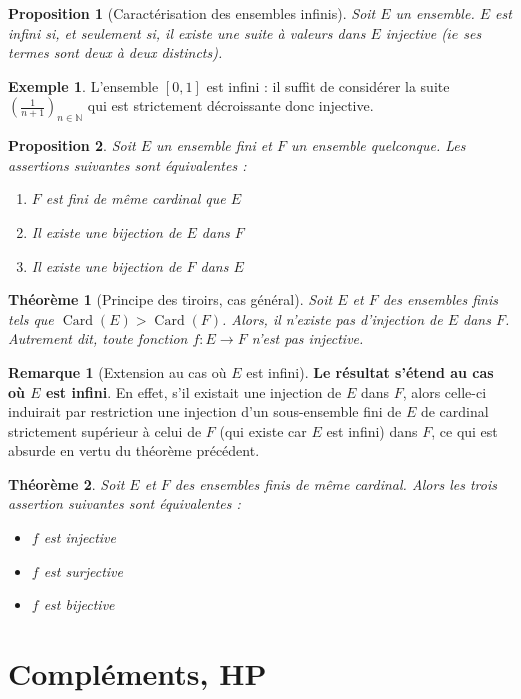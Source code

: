 \documentclass[french]{book}
\newcommand{\N}{\mathbb{N}}
\theoremstyle{plain}
\newtheorem{thm}{Théorème}[chapter]
\newtheorem{prop}{Proposition}[chapter]
\theoremstyle{definition}
\newtheorem{exa}{Exemple}[chapter]
\newtheorem{rmq}{Remarque}[chapter]
\theoremstyle{remark}
\DeclareMathOperator{\card}{Card}
\begin{document}
\begin{prop}[Caractérisation des ensembles infinis]
	Soit $E$ un ensemble. $E$ est infini si, et seulement si, il existe une suite à valeurs dans $E$ injective ($ie$ ses termes sont deux à deux distincts).
\end{prop}
\begin{exa}
	L'ensemble $[0,1]$ est infini : il suffit de considérer la suite $\displaystyle\left(\frac{1}{n+1}\right)_{n\in\N}$ qui est strictement décroissante donc injective.
\end{exa}
\begin{prop}
	Soit $E$ un ensemble fini et $F$ un ensemble quelconque. Les assertions suivantes sont équivalentes :
	\begin{enumerate}
		\item $F$ est fini de même cardinal que $E$
		\item Il existe une bijection de $E$ dans $F$
		\item Il existe une bijection de $F$ dans $E$
	\end{enumerate}
\end{prop}
\begin{thm}[Principe des tiroirs, cas général]
	Soit $E$ et $F$ des ensembles finis tels que $\card(E)>\card(F)$. Alors, il n'existe pas d'injection de $E$ dans $F$. Autrement dit, toute fonction $f:E\rightarrow F$ n'est pas injective.
\end{thm}
\begin{rmq}[Extension au cas où $E$ est infini]
	\textbf{Le résultat s'étend au cas où $E$ est infini}. En effet, s'il existait une injection de $E$ dans $F$, alors celle-ci induirait par restriction une injection d'un sous-ensemble fini de $E$ de cardinal strictement supérieur à celui de $F$ (qui existe car $E$ est infini) dans $F$, ce qui est absurde en vertu du théorème précédent. 
\end{rmq}
\begin{thm}
	Soit $E$ et $F$ des ensembles finis de même cardinal. Alors les trois assertion suivantes sont équivalentes : \begin{itemize}
	\item $f$ est injective
	\item $f$ est surjective
	\item $f$ est bijective
\end{itemize}
\end{thm}
\section{Compléments, HP}
\end{document}
